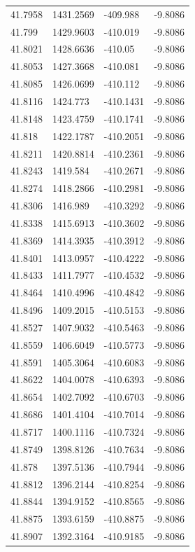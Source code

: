 \begin{table}[H]
\begin{tabular}{llll}
41.7958 & 1431.2569 & -409.988 & -9.8086 \\
41.799 & 1429.9603 & -410.019 & -9.8086 \\
41.8021 & 1428.6636 & -410.05 & -9.8086 \\
41.8053 & 1427.3668 & -410.081 & -9.8086 \\
41.8085 & 1426.0699 & -410.112 & -9.8086 \\
41.8116 & 1424.773 & -410.1431 & -9.8086 \\
41.8148 & 1423.4759 & -410.1741 & -9.8086 \\
41.818 & 1422.1787 & -410.2051 & -9.8086 \\
41.8211 & 1420.8814 & -410.2361 & -9.8086 \\
41.8243 & 1419.584 & -410.2671 & -9.8086 \\
41.8274 & 1418.2866 & -410.2981 & -9.8086 \\
41.8306 & 1416.989 & -410.3292 & -9.8086 \\
41.8338 & 1415.6913 & -410.3602 & -9.8086 \\
41.8369 & 1414.3935 & -410.3912 & -9.8086 \\
41.8401 & 1413.0957 & -410.4222 & -9.8086 \\
41.8433 & 1411.7977 & -410.4532 & -9.8086 \\
41.8464 & 1410.4996 & -410.4842 & -9.8086 \\
41.8496 & 1409.2015 & -410.5153 & -9.8086 \\
41.8527 & 1407.9032 & -410.5463 & -9.8086 \\
41.8559 & 1406.6049 & -410.5773 & -9.8086 \\
41.8591 & 1405.3064 & -410.6083 & -9.8086 \\
41.8622 & 1404.0078 & -410.6393 & -9.8086 \\
41.8654 & 1402.7092 & -410.6703 & -9.8086 \\
41.8686 & 1401.4104 & -410.7014 & -9.8086 \\
41.8717 & 1400.1116 & -410.7324 & -9.8086 \\
41.8749 & 1398.8126 & -410.7634 & -9.8086 \\
41.878 & 1397.5136 & -410.7944 & -9.8086 \\
41.8812 & 1396.2144 & -410.8254 & -9.8086 \\
41.8844 & 1394.9152 & -410.8565 & -9.8086 \\
41.8875 & 1393.6159 & -410.8875 & -9.8086 \\
41.8907 & 1392.3164 & -410.9185 & -9.8086 \\

\end{tabular}
\end{table}
